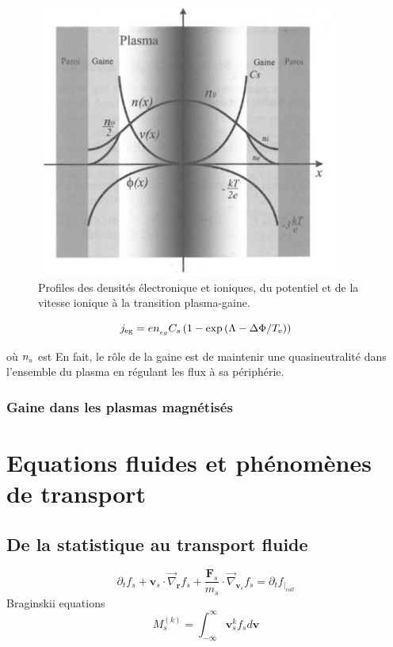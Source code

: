\begin{refsection}
\begin{figure}[htbp]
\centering
\includegraphics[height=90mm,width=100mm]{figures/sheath2.jpg}{\caption{Profiles
des densités électronique et ioniques,
du potentiel et de la vitesse ionique à
la transition plasma-gaine\parencite{Rax}.}\label{1-profilesgaine}}
\end{figure}

\begin{equation}
j_\text{eg}=en_{_{eg}}C_s\left(1-\exp{(\Lambda-\Delta\Phi/T_\text{e})}\right)
\end{equation} 

où $n_{_{0}}$ est
  En fait, le rôle de
la gaine est de maintenir une quasineutralité dans l'ensemble du plasma en régulant les flux à sa périphérie.

\subsubsection{Gaine dans les plasmas magnétisés}

\section{Equations fluides et phénomènes de transport}
\label{Maxwell-Boltzmann}
\subsection{De la statistique au transport fluide}
$$\partial_tf_s+\mathbf{v}_s\cdot\vec\nabla_\mathbf{r}f_s+
\frac{\mathbf{F}_s}{m_s}\cdot\vec\nabla_{\mathbf{v}_s}f_s
=\partial_tf_{|_{coll}}$$ 
Braginskii equations
$$M^{(k)}_s=\int_{-\infty}^{\infty}\mathbf{v}_s^kf_sd\mathbf{v}$$

\end{refsection}
